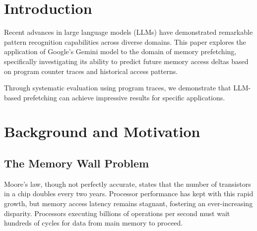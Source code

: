 \documentclass[sigconf,authorversion,nonacm]{acmart}
\begin{document}


\maketitle

\section{Introduction}
\label{sec:introduction}

Recent advances in large language models (LLMs) have demonstrated remarkable pattern recognition capabilities across diverse domains\cite{harte2023leveraging}. This paper explores the application of Google's Gemini model to the domain of memory prefetching, specifically investigating its ability to predict future memory access deltas based on program counter traces and historical access patterns.

Through systematic evaluation using program traces, we demonstrate that LLM-based prefetching can achieve impressive results for specific applications.


\section{Background and Motivation} \label{sec:background}

\subsection{The Memory Wall Problem}
Moore's law, though not perfectly accurate, states that the number of transistors in a chip doubles every two years. Processor performance has kept with this rapid growth, but memory access latency remains stagnant, fostering an ever-increasing disparity. Processors executing billions of operations per second must wait hundreds of cycles for data from main memory to proceed.

\end{document}
